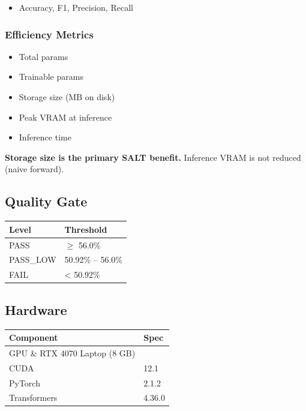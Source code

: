 \begin{itemize}
\item Accuracy, F1, Precision, Recall

\end{itemize}
\subsubsection{Efficiency Metrics}

\begin{itemize}
\item Total params
\item Trainable params
\item Storage size (MB on disk)
\item Peak VRAM at inference
\item Inference time

\end{itemize}
\textbf{Storage size is the primary SALT benefit.} Inference VRAM is not reduced 
(naive forward).

\subsection{Quality Gate}

\begin{table}[H]
\centering
\small
\begin{tabular}{ll}
\toprule
\textbf{Level} & \textbf{Threshold} \\
\midrule
PASS & $\ge$ 56.0\% \\
PASS\_LOW & 50.92\% -- 56.0\% \\
FAIL & < 50.92\% \\
\bottomrule
\end{tabular}
\end{table}

\subsection{Hardware}

\begin{table}[H]
\centering
\small
\begin{tabular}{ll}
\toprule
\textbf{Component} & \textbf{Spec} \\
\midrule
GPU \& RTX 4070 Laptop (8 GB) \\
CUDA & 12.1 \\
PyTorch & 2.1.2 \\
Transformers & 4.36.0 \\
\bottomrule
\end{tabular}
\end{table}

